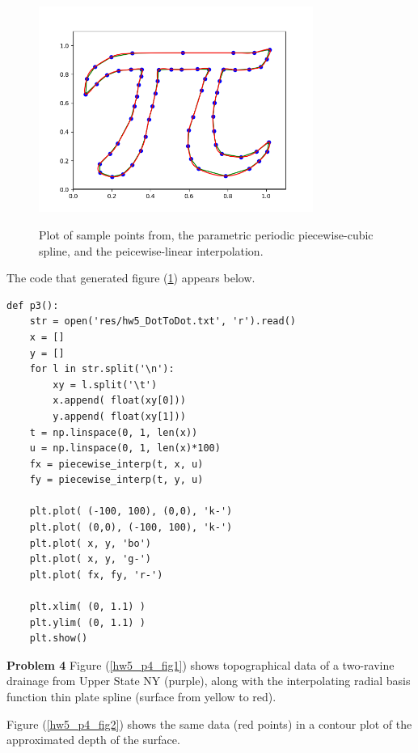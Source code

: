\documentclass[12pt]{article}
\newcommand{\problem}[1]{\hspace{-4 ex} \large \textbf{Problem #1} }
\begin{document}
	\begin{figure}[H]
		\caption{Plot of sample points from, the parametric periodic piecewise-cubic spline, and the peicewise-linear interpolation.}
		\includegraphics[width=0.80\textwidth]{hw5_p3_fig1}
		\label{hw5_p3_fig1}
		\centering
	\end{figure}
	
	The code that generated figure (\ref{hw5_p3_fig1}) appears below.
	
	\begin{lstlisting}
def p3():
	str = open('res/hw5_DotToDot.txt', 'r').read()
	x = []
	y = []
	for l in str.split('\n'):
		xy = l.split('\t')
		x.append( float(xy[0]))
		y.append( float(xy[1]))
	t = np.linspace(0, 1, len(x))
	u = np.linspace(0, 1, len(x)*100)
	fx = piecewise_interp(t, x, u)
	fy = piecewise_interp(t, y, u)
	
	plt.plot( (-100, 100), (0,0), 'k-')
	plt.plot( (0,0), (-100, 100), 'k-')
	plt.plot( x, y, 'bo')
	plt.plot( x, y, 'g-')
	plt.plot( fx, fy, 'r-')
	
	plt.xlim( (0, 1.1) )
	plt.ylim( (0, 1.1) )
	plt.show()
	\end{lstlisting}
	
	
\problem{4} Figure (\ref{hw5_p4_fig1}) shows topographical data of a two-ravine drainage from Upper State NY (purple), along with the interpolating radial basis function thin plate spline (surface from yellow to red).

	Figure (\ref{hw5_p4_fig2}) shows the same data (red points) in a contour plot of the approximated depth of the surface.
\end{document}
